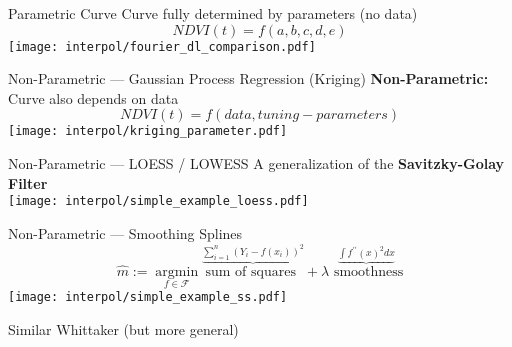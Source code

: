 
\begin{frame}[fragile]{Parametric Curve}
    Curve fully determined by parameters (no data)
    $$
        NDVI(t) = f(a,b,c,d,e)
    $$
    \texttt{[image: interpol/fourier\_dl\_comparison.pdf]}
\end{frame}




%     


\begin{frame}{Non-Parametric --- Gaussian Process Regression (Kriging)}
    \textbf{Non-Parametric:} Curve also depends on data
    \large
    $$
        NDVI(t) = f({data}, {tuning-parameters})
    $$
    \texttt{[image: interpol/kriging\_parameter.pdf]}
\end{frame}

\begin{frame}{Non-Parametric --- LOESS / LOWESS}
    A generalization of the \textbf{Savitzky-Golay Filter} \\
    \color{mygray}{(allows for non-equidistant points and interpolation)}
    \centering
    \texttt{[image: interpol/simple\_example\_loess.pdf]}
\end{frame}


\begin{frame}{Non-Parametric --- Smoothing Splines}
    $$\hat m :=\underset{f \in \mathcal F}{\operatorname{argmin}}
        \overset{\underbrace{\sum_{i=1}^{n}\left(Y_{i}-{f}\left(x_{i}\right)\right)^{2}}}{\text{sum of squares }}
        + \lambda \overset{\underbrace{\int {f}^{\prime \prime}(x)^{2} d x}}{\text{ smoothness}}$$
    \centering
    \texttt{[image: interpol/simple\_example\_ss.pdf]}

    Similar Whittaker (but more general)
\end{frame}


